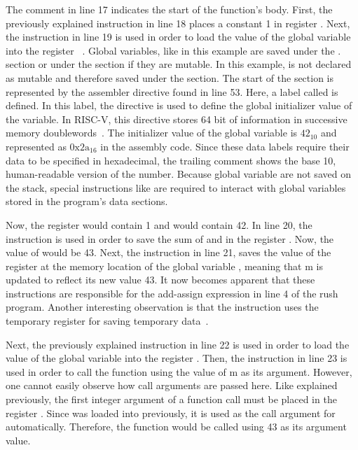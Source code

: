 The comment in line 17 indicates the start of the function's body.
First, the previously explained  instruction in line 18 places a constant 1 in register .
Next, the  instruction in line 19 is used in order to load the value of the global variable  into the register ~\cite[reference]{Patterson2017}.
Global variables, like  in this example are saved under the . section or under the  section if they are mutable.
In this example,  is not declared as mutable and therefore saved under the  section.
The start of the  section is represented by the  assembler directive found in line 53.
Here, a label called  is defined.
In this label, the  directive is used to define the global initializer value of the variable.
In RISC-V, this directive stores 64 bit of information in successive memory doublewords~\cite[p.~39]{Patterson2017}.
The initializer value of the global variable is $42_{10}$ and represented as $\text{0x2a}_{16}$ in the assembly code. 
Since these data labels require their data to be specified in hexadecimal, the trailing comment shows the base 10, human-readable version of the number.
Because global variable are not saved on the stack, special instructions like  are required to interact with global variables stored in the program's data sections.

Now, the register  would contain 1 and  would contain 42.
In line 20, the  instruction is used in order to save the sum of  and  in the register .
Now, the value of  would be 43.
Next, the  instruction in line 21, saves the value of the register  at the memory location of the global variable , meaning that m is updated to reflect its new value 43.
It now becomes apparent that these instructions are responsible for the add-assign expression in line 4 of the rush program.
Another interesting observation is that the  instruction uses the temporary register  for saving temporary data~\cite[reference]{Patterson2017}.

Next, the previously explained  instruction in line 22 is used in order to load the value of the global variable into the register .
Then, the  instruction in line 23 is used in order to call the  function using the value of m as its argument.
However, one cannot easily observe how call arguments are passed here.
Like explained previously, the first integer argument of a function call must be placed in the register .
Since  was loaded into  previously, it is used as the call argument for  automatically.
Therefore, the  function would be called using 43 as its argument value.

